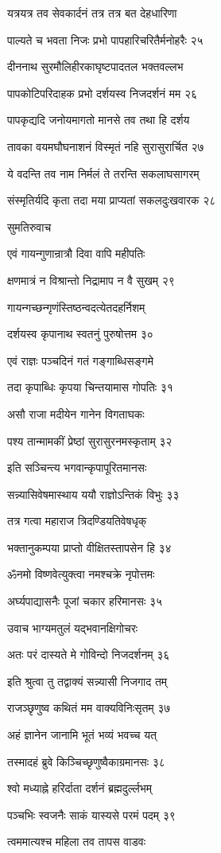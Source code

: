 यत्रयत्र तव सेवकार्दनं तत्र तत्र बत देहधारिणा

पाल्यते च भवता निजः प्रभो पापहारिचरितैर्मनोहरैः २५

दीननाथ सुरमौलिहीरकाघृष्टपादतल भक्तवल्लभ

पापकोटिपरिदाहक प्रभो दर्शयस्व निजदर्शनं मम २६

पापकृद्यदि जनोयमागतो मानसे तव तथा हि दर्शय

तावका वयमघौघनाशनं विस्मृतं नहि सुरासुरार्चित २७

ये वदन्ति तव नाम निर्मलं ते तरन्ति सकलाघसागरम्

संस्मृतिर्यदि कृता तदा मया प्राप्यतां सकलदुःखवारक २८

सुमतिरुवाच

एवं गायन्गुणान्रात्रौ दिवा वापि महीपतिः

क्षणमात्रं न विश्रान्तो निद्रामाप न वै सुखम् २९

गायन्गच्छन्गृणंस्तिष्ठन्वदत्येतदहर्निशम्

दर्शयस्व कृपानाथ स्वतनुं पुरुषोत्तम ३०

एवं राज्ञः पञ्चदिनं गतं गङ्गाब्धिसङ्गमे

तदा कृपाब्धिः कृपया चिन्तयामास गोपतिः ३१

असौ राजा मदीयेन गानेन विगताघकः

पश्य तान्मामकीं प्रेष्ठां सुरासुरनमस्कृताम् ३२

इति सञ्चिन्त्य भगवान्कृपापूरितमानसः

सन्न्यासिवेषमास्थाय ययौ राज्ञोऽन्तिकं विभुः ३३

तत्र गत्वा महाराज त्रिदण्डियतिवेषधृक्

भक्तानुकम्पया प्राप्तो वीक्षितस्तापसेन हि ३४

ॐनमो विष्णवेत्युक्त्वा नमश्चक्रे नृपोत्तमः

अर्घ्यपाद्यासनैः पूजां चकार हरिमानसः ३५

उवाच भाग्यमतुलं यद्भवानक्षिगोचरः

अतः परं दास्यते मे गोविन्दो निजदर्शनम् ३६

इति श्रुत्वा तु तद्वाक्यं सन्न्यासी निजगाद तम्

राजञ्छृणुष्व कथितं मम वाक्यविनिःसृतम् ३७

अहं ज्ञानेन जानामि भूतं भव्यं भवच्च यत्

तस्मादहं ब्रुवे किञ्चिच्छृणुष्वैकाग्रमानसः ३८

श्वो मध्याह्ने हरिर्दाता दर्शनं ब्रह्मदुर्ल्लभम्

पञ्चभिः स्वजनैः साकं यास्यसे परमं पदम् ३९

त्वममात्यश्च महिला तव तापस वाडवः


